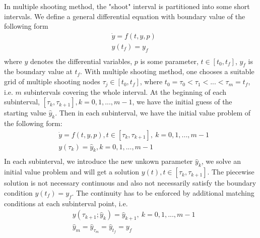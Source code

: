 In multiple shooting method, the "shoot" interval is partitioned into some short intervals. We define a general differential equation with boundary value of the following form
\begin{equation}\label{eqn:ori_dae}
	\begin{aligned}
		& \dot{y} = f(t, y, p) \\ 
		& y(t_f) = y_f  \\
	\end{aligned}
\end{equation}
where $y$ denotes the differential variables, $p$ is some parameter, $t \in [t_0, t_f]$,  $y_f$ is the boundary value at $t_f$.  With multiple shooting method, one chooses a suitable grid of multiple shooting nodes $\tau_j \in [t_0,t_f] $, where $t_0 = \tau_0 < \tau_1 < ... < \tau_m = t_f$,  i.e. $m$ subintervals covering the whole interval. At the beginning of each subinterval, $[\tau_k, \tau_{k+1}], k = 0, 1, ..., m-1$, we have the initial guess of the starting value $\hat{y}_k$. Then in each subinterval, we have the initial value problem of the following form: 
\begin{equation}\label{eqn:msh}
	\begin{aligned}
		& \dot{y} = f(t, y, p) , t \in [\tau_k, \tau_{k+1}], \ k = 0, 1, ..., m-1   \\ 
		& y(\tau_k) = \hat{y}_k, k = 0, 1, ..., m-1  \\
	\end{aligned}
\end{equation}
In each subinterval, we introduce the new unkown parameter $\hat{y}_k$, we solve an initial value problem and will get a solution $y(t), t \in [\tau_k, \tau_{k+1}]$. The piecewise solution is not necessary continuous and also not necessarily satisfy the boundary condition $y(t_f) = y_f$. The continuity has to be enforced by additional matching conditions at each subinterval point, i.e. 
\begin{equation}\label{eqn:mc}
	\begin{aligned}
		& y(\tau_{k+1}; \hat{y}_k) = \hat{y}_{k+1}, \  k = 0, 1, ..., m-1  \\
		& \hat{y}_{m} = \hat{y}_{\tau_m} = \hat{y}_{t_f} =  y_f 
	\end{aligned}
\end{equation}

